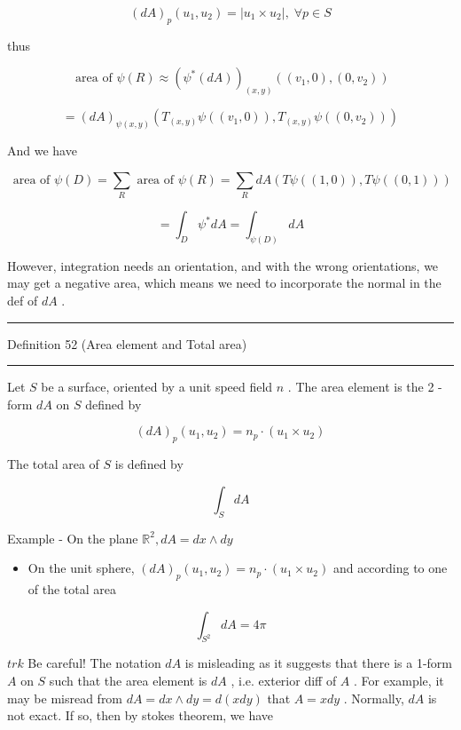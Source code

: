 \documentclass[lang=cn,a4paper,11pt,openany,twoside]{elegantbook}
\newcommand{\HRule}{\begin{center}\rule{0.9\linewidth}{0.2mm}\end{center}}
\begin{document}
\[
{\left( dA\right) }_{p}\left( {{u}_{1},{u}_{2}}\right)  = \left| {{u}_{1} \times  {u}_{2}}\right| ,\;\forall p \in  S
\]

thus

\[
\text{ area of }\psi \left( R\right)  \approx  {\left( {\psi }^{ * }\left( dA\right) \right) }_{\left( x,y\right) }\left( {\left( {{v}_{1},0}\right) ,\left( {0,{v}_{2}}\right) }\right)
\]

\[
= {\left( dA\right) }_{\psi \left( {x,y}\right) }\left( {{T}_{\left( x,y\right) }\psi \left( \left( {{v}_{1},0}\right) \right) ,{T}_{\left( x,y\right) }\psi \left( \left( {0,{v}_{2}}\right) \right) }\right)
\]

And we have

\[
\text{ area of }\psi \left( D\right)  = \mathop{\sum }\limits_{R}\text{ area of }\psi \left( R\right)  = \mathop{\sum }\limits_{R}{dA}\left( {{T\psi }\left( \left( {1,0}\right) \right) ,{T\psi }\left( \left( {0,1}\right) \right) }\right)
\]

\[
= {\int }_{D}{\psi }^{ * }{dA} = {\int }_{\psi \left( D\right) }{dA}
\]

However, integration needs an orientation, and with the wrong orientations, we may get a negative area, which means we need to incorporate the normal in the def of \({dA}\) .

\HRule

Definition 52 (Area element and Total area)

\HRule

Let \(S\) be a surface, oriented by a unit speed field \(n\) . The area element is the 2 -form \({dA}\) on \(S\) defined by

\[
{\left( dA\right) }_{p}\left( {{u}_{1},{u}_{2}}\right)  = {n}_{p} \cdot  \left( {{u}_{1} \times  {u}_{2}}\right)
\]

The total area of \(S\) is defined by

\[
{\int }_{S}{dA}
\]

Example - On the plane \({\mathbb{R}}^{2},{dA} = {dx} \land  {dy}\)

\begin{itemize}\relax
\item\relax On the unit sphere, \({\left( dA\right) }_{p}\left( {{u}_{1},{u}_{2}}\right)  = {n}_{p} \cdot  \left( {{u}_{1} \times  {u}_{2}}\right)\) and according to one of the total area
\end{itemize}

\[
{\int }_{{S}^{2}}{dA} = {4\pi }
\]

\({trk}\) Be careful! The notation \({dA}\) is misleading as it suggests that there is a 1-form \(A\) on \(S\) such that the area element is \({dA}\) , i.e. exterior diff of \(A\) . For example, it may be misread from \({dA} = {dx} \land  {dy} = d\left( {xdy}\right)\) that \(A = {xdy}\) . Normally, \({dA}\) is not exact. If so, then by stokes theorem, we have
\end{document}
